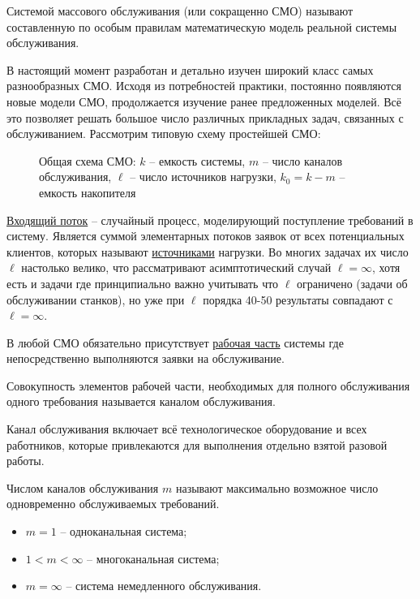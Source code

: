 \begin{definition}
	Системой массового обслуживания (или сокращенно СМО) называют составленную по особым правилам математическую модель реальной системы обслуживания.
\end{definition}

В настоящий момент разработан и детально изучен широкий класс самых разнообразных СМО. Исходя из потребностей практики, постоянно появляются новые модели СМО, продолжается изучение ранее предложенных моделей. Всё это позволяет решать большое число различных прикладных задач, связанных с обслуживанием.
\newpage
Рассмотрим типовую схему простейшей СМО:
\begin{figure}[h!]
	\centering
	\caption{Общая схема СМО: $k$ -- емкость системы, $m$ -- число каналов обслуживания, $\ell$ -- число источников нагрузки, $k_0 = k - m$ -- емкость накопителя}
	\label{img:1}
\end{figure}

\underline{Входящий поток} -- случайный процесс, моделирующий поступление требований в систему. Является суммой элементарных потоков заявок от всех потенциальных клиентов, которых называют \underline{источниками} нагрузки. Во многих задачах их число $\ell$ настолько велико, что рассматривают асимптотический случай $\ell = \infty$, хотя есть и задачи где принципиально важно учитывать что $\ell$ ограничено (задачи об обслуживании станков), но уже при $\ell$ порядка 40-50 результаты совпадают с $\ell = \infty$.

В любой СМО обязательно присутствует \underline{рабочая часть} системы где непосредственно выполняются заявки на обслуживание.

\begin{definition}
	Совокупность элементов рабочей части, необходимых для полного обслуживания одного требования называется {\color{red}каналом обслуживания}.
\end{definition}

Канал обслуживания включает всё технологическое оборудование и всех работников, которые привлекаются для выполнения отдельно взятой разовой работы.

\begin{definition}
	{\color{red}Числом каналов обслуживания} $m$ называют максимально возможное число одновременно обслуживаемых требований.
\end{definition}

\begin{itemize}
	\item $m = 1$ -- одноканальная система;
	\item $1 < m < \infty$ -- многоканальная система;
	\item $m = \infty$ -- система немедленного обслуживания.
\end{itemize}

